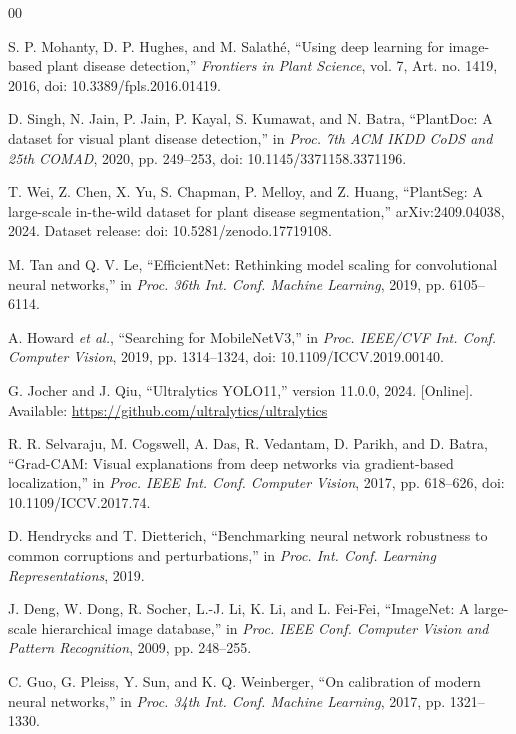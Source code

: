 \documentclass[conference]{IEEEtran}
\begin{document}
\begin{thebibliography}{00}

S. P. Mohanty, D. P. Hughes, and M. Salath\'{e}, ``Using deep learning for image-based plant
disease detection,'' \emph{Frontiers in Plant Science}, vol. 7, Art. no. 1419, 2016,
doi: 10.3389/fpls.2016.01419.

D. Singh, N. Jain, P. Jain, P. Kayal, S. Kumawat, and N. Batra, ``PlantDoc: A dataset for visual
plant disease detection,'' in \emph{Proc. 7th ACM IKDD CoDS and 25th COMAD}, 2020, pp. 249--253,
doi: 10.1145/3371158.3371196.

T. Wei, Z. Chen, X. Yu, S. Chapman, P. Melloy, and Z. Huang, ``PlantSeg: A large-scale in-the-wild
dataset for plant disease segmentation,'' arXiv:2409.04038, 2024. Dataset release:
doi: 10.5281/zenodo.17719108.

M. Tan and Q. V. Le, ``EfficientNet: Rethinking model scaling for convolutional neural networks,''
in \emph{Proc. 36th Int. Conf. Machine Learning}, 2019, pp. 6105--6114.

A. Howard \emph{et al.}, ``Searching for MobileNetV3,'' in \emph{Proc. IEEE/CVF Int. Conf.
Computer Vision}, 2019, pp. 1314--1324, doi: 10.1109/ICCV.2019.00140.

G. Jocher and J. Qiu, ``Ultralytics YOLO11,'' version 11.0.0, 2024. [Online]. Available:
\url{https://github.com/ultralytics/ultralytics}

R. R. Selvaraju, M. Cogswell, A. Das, R. Vedantam, D. Parikh, and D. Batra, ``Grad-CAM: Visual
explanations from deep networks via gradient-based localization,'' in \emph{Proc. IEEE Int. Conf.
Computer Vision}, 2017, pp. 618--626, doi: 10.1109/ICCV.2017.74.

D. Hendrycks and T. Dietterich, ``Benchmarking neural network robustness to common corruptions and
perturbations,'' in \emph{Proc. Int. Conf. Learning Representations}, 2019.

J. Deng, W. Dong, R. Socher, L.-J. Li, K. Li, and L. Fei-Fei, ``ImageNet: A large-scale
hierarchical image database,'' in \emph{Proc. IEEE Conf. Computer Vision and Pattern Recognition},
2009, pp. 248--255.

C. Guo, G. Pleiss, Y. Sun, and K. Q. Weinberger, ``On calibration of modern neural networks,'' in
\emph{Proc. 34th Int. Conf. Machine Learning}, 2017, pp. 1321--1330.

\end{thebibliography}
\end{document}
